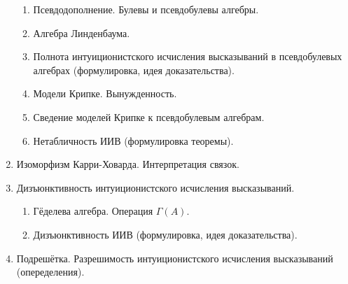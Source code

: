 \documentclass[11pt,a4paper,oneside]{scrartcl}
\begin{document}
\begin{enumerate}
\begin{enumerate}
\item Псевдодополнение. Булевы и псевдобулевы алгебры.
\item Алгебра Линденбаума. 
\item Полнота интуиционистского исчисления высказываний в псевдобулевых алгебрах (формулировка, идея доказательства).
\item Модели Крипке. Вынужденность.
\item Сведение моделей Крипке к псевдобулевым алгебрам. 
\item Нетабличность ИИВ (формулировка теоремы).
\end{enumerate}
\item Изоморфизм Карри-Ховарда. Интерпретация связок.
\item Дизъюнктивность интуиционистского исчисления высказываний.
\begin{enumerate}
\item Гёделева алгебра. Операция $\Gamma(A)$.
\item Дизъюнктивность ИИВ (формулировка, идея доказательства).
\end{enumerate}
\item Подрешётка. Разрешимость интуиционистского исчисления высказываний (опеределения).

\end{enumerate}
\end{document}
